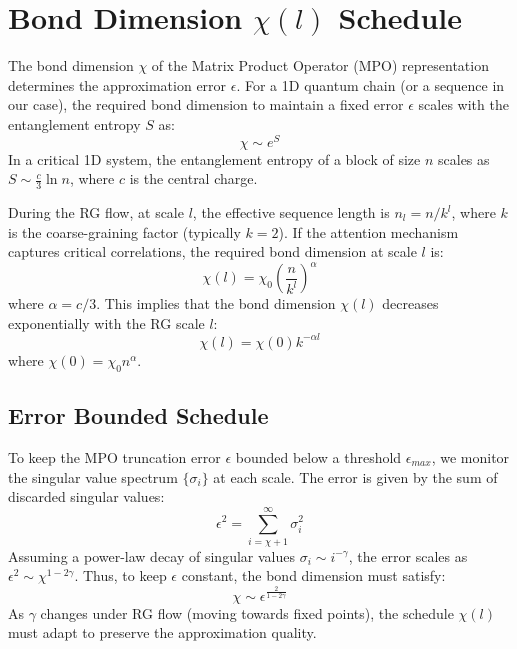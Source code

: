 \documentclass{article}
\begin{document}
\section{Bond Dimension $\chi(l)$ Schedule}
The bond dimension $\chi$ of the Matrix Product Operator (MPO) representation determines the approximation error $\epsilon$. For a 1D quantum chain (or a sequence in our case), the required bond dimension to maintain a fixed error $\epsilon$ scales with the entanglement entropy $S$ as:
\begin{equation}
    \chi \sim e^{S}
\end{equation}
In a critical 1D system, the entanglement entropy of a block of size $n$ scales as $S \sim \frac{c}{3} \ln n$, where $c$ is the central charge.

During the RG flow, at scale $l$, the effective sequence length is $n_l = n / k^l$, where $k$ is the coarse-graining factor (typically $k=2$). If the attention mechanism captures critical correlations, the required bond dimension at scale $l$ is:
\begin{equation}
    \chi(l) = \chi_0 \left( \frac{n}{k^l} \right)^{\alpha}
\end{equation}
where $\alpha = c/3$. This implies that the bond dimension $\chi(l)$ decreases exponentially with the RG scale $l$:
\begin{equation}
    \chi(l) = \chi(0) k^{-\alpha l}
\end{equation}
where $\chi(0) = \chi_0 n^\alpha$.

\subsection{Error Bounded Schedule}
To keep the MPO truncation error $\epsilon$ bounded below a threshold $\epsilon_{max}$, we monitor the singular value spectrum $\{\sigma_i\}$ at each scale. The error is given by the sum of discarded singular values:
\begin{equation}
    \epsilon^2 = \sum_{i=\chi+1}^{\infty} \sigma_i^2
\end{equation}
Assuming a power-law decay of singular values $\sigma_i \sim i^{-\gamma}$, the error scales as $\epsilon^2 \sim \chi^{1-2\gamma}$. Thus, to keep $\epsilon$ constant, the bond dimension must satisfy:
\begin{equation}
    \chi \sim \epsilon^{\frac{2}{1-2\gamma}}
\end{equation}
As $\gamma$ changes under RG flow (moving towards fixed points), the schedule $\chi(l)$ must adapt to preserve the approximation quality.
\end{document}
